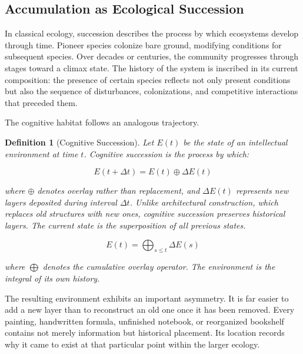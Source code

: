 \documentclass[12pt,oneside]{article}
\newtheorem{definition}{Definition}[section]
\theoremstyle{remark}
\begin{document}
\subsection{Accumulation as Ecological Succession}

In classical ecology, succession describes the process by which ecosystems develop through time. Pioneer species colonize bare ground, modifying conditions for subsequent species. Over decades or centuries, the community progresses through stages toward a climax state. The history of the system is inscribed in its current composition: the presence of certain species reflects not only present conditions but also the sequence of disturbances, colonizations, and competitive interactions that preceded them.

The cognitive habitat follows an analogous trajectory.

\begin{definition}[Cognitive Succession]
Let $E(t)$ be the state of an intellectual environment at time $t$. Cognitive succession is the process by which:

\begin{equation}
E(t + \Delta t) = E(t) \oplus \Delta E(t)
\end{equation}

where $\oplus$ denotes overlay rather than replacement, and $\Delta E(t)$ represents new layers deposited during interval $\Delta t$. Unlike architectural construction, which replaces old structures with new ones, cognitive succession preserves historical layers. The current state is the superposition of all previous states.

\begin{equation}
E(t) = \bigoplus_{s \leq t} \Delta E(s)
\end{equation}

where $\bigoplus$ denotes the cumulative overlay operator. The environment is the integral of its own history.
\end{definition}

The resulting environment exhibits an important asymmetry. It is far easier to add a new layer than to reconstruct an old one once it has been removed. Every painting, handwritten formula, unfinished notebook, or reorganized bookshelf contains not merely information but historical placement. Its location records why it came to exist at that particular point within the larger ecology.
\end{document}
